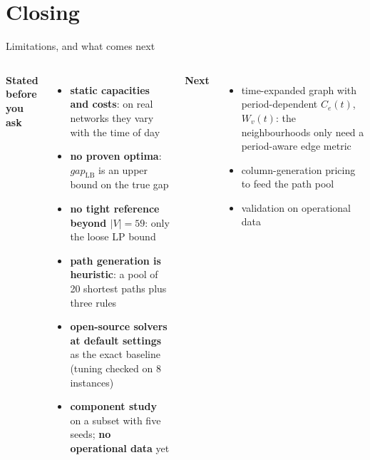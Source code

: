 \documentclass[aspectratio=169,10pt]{beamer}
\newcommand{\gapLB}{gap_{\mathrm{LB}}}
\begin{document}
\section{Closing}

\begin{frame}{Limitations, and what comes next}
\begin{columns}[T]
\textbf{Stated before you ask}
\begin{itemize}\small
\item \textbf{static capacities and costs}: on real networks they vary with the time of day
\item \textbf{no proven optima}: $\gapLB$ is an upper bound on the true gap
\item \textbf{no tight reference beyond $|V|=59$}: only the loose LP bound
\item \textbf{path generation is heuristic}: a pool of 20 shortest paths plus three rules
\item \textbf{open-source solvers at default settings} as the exact baseline (tuning checked on 8 instances)
\item \textbf{component study} on a subset with five seeds; \textbf{no operational data} yet
\end{itemize}
\textbf{Next}
\begin{itemize}\small
\item time-expanded graph with period-dependent $C_e(t)$, $W_v(t)$: the neighbourhoods only need a period-aware edge metric
\item column-generation pricing to feed the path pool
\item validation on operational data
\end{itemize}
\end{columns}
\end{frame}
\end{document}
